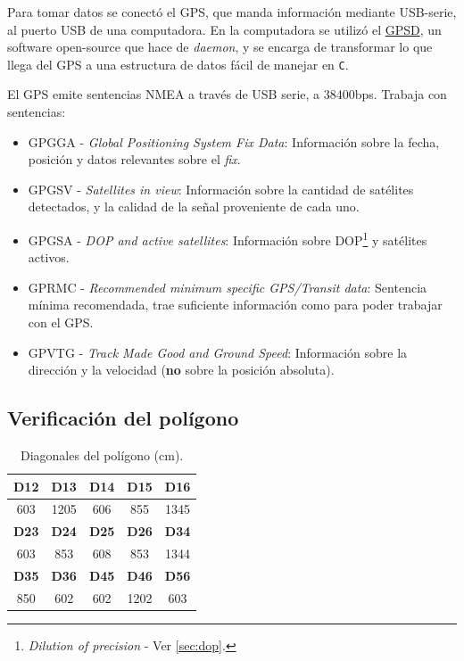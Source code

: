 \documentclass[main]{subfiles}
\begin{document}
Para tomar datos se conectó el GPS, que manda información mediante USB-serie, al puerto USB de una computadora. En la computadora se utilizó el \href{http://catb.org/gpsd/}{GPSD}, un software open-source que hace de \textit{daemon}, y se encarga de transformar lo que llega del GPS a una estructura de datos fácil de manejar en \verb+C+.

El GPS emite sentencias NMEA a través de USB serie, a 38400bps. Trabaja con sentencias:
\begin{itemize}
\item GPGGA - \textit{Global Positioning System Fix Data}: Información sobre la fecha, posición y datos relevantes sobre el \textit{fix}.
\item GPGSV - \textit{Satellites in view}: Información sobre la cantidad de satélites detectados, y la calidad de la señal proveniente de cada uno.
\item GPGSA - \textit{DOP and active satellites}: Información sobre DOP\footnote{\textit{Dilution of precision} - Ver \ref{sec:dop}.} y satélites activos.
\item GPRMC - \textit{Recommended minimum specific GPS/Transit data}: Sentencia mínima recomendada, trae suficiente información como para poder trabajar con el GPS.
\item GPVTG - \textit{Track Made Good and Ground Speed}: Información sobre la dirección y la velocidad (\textbf{no} sobre la posición absoluta).
\end{itemize}

\subsection{Verificación del polígono}
\label{sec:verificacion-del-poligono}

\begin{table}
\centering
\vspace{-25pt}
\caption{Diagonales del polígono (cm).}\label{tab:diagonales-poligono}
\begin{tabular}{|c|c|c|c|c|}
\hline
\rowcolor[gray]{0.9}
\textbf{D12} & \textbf{D13} & \textbf{D14} & \textbf{D15} & \textbf{D16} \\
\hline
603 & 1205 & 606 & 855 & 1345 \\
\hline
\rowcolor[gray]{0.9}
\textbf{D23} & \textbf{D24} & \textbf{D25} & \textbf{D26} & \textbf{D34} \\
\hline
603 & 853 & 608 & 853 & 1344\\
\hline
\rowcolor[gray]{0.9}
\textbf{D35} & \textbf{D36} & \textbf{D45} & \textbf{D46} & \textbf{D56} \\
\hline
850 & 602 & 602 & 1202 & 603 \\
\hline
\end{tabular}
\vspace{-30pt}
\end{table}
\end{document}
